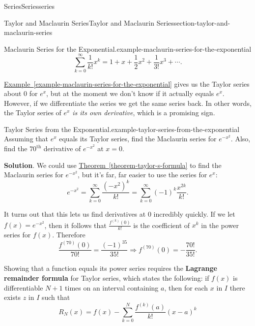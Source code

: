 \documentclass[oneside,10pt,]{book}
\newcommand{\terminology}[1]{\textbf{#1}}
\numberwithin{equation}{section}
\begin{document}
\begin{chapterptx}{Series}{}{Series}{}{}{series}
\begin{sectionptx}{Taylor and Maclaurin Series}{}{Taylor and Maclaurin Series}{}{}{section-taylor-and-maclaurin-series}
\begin{example}{Maclaurin Series for the Exponential.}{example-maclaurin-series-for-the-exponential}
\begin{equation*}
\sum_{k=0}^{\infty}\frac{1}{k!}x^{k} = 1 + x + \frac{1}{2}x^{2} + \frac{1}{3!}x^{3} + \cdots\text{.}
\end{equation*}
%
\end{example}
\hypertarget{p-966}{}%
\hyperref[example-maclaurin-series-for-the-exponential]{Example~\ref{example-maclaurin-series-for-the-exponential}} gives us the Taylor series about \(0\) for \(e^{x}\), but at the moment we don't know if it actually equals \(e^{x}\). However, if we differentiate the series we get the same series back. In other words, the Taylor series of \(e^{x}\) \emph{is its own derivative}, which is a promising sign.%
\begin{example}{Taylor Series from the Exponential.}{example-taylor-series-from-the-exponential}%
\hypertarget{p-967}{}%
Assuming that \(e^{x}\) equals its Taylor series, find the Maclaurin series for \(e^{-x^{2}}\). Also, find the \(70^{\text{th}}\) derivative of \(e^{-x^{2}}\) at \(x = 0\).%
\par\smallskip%
\noindent\textbf{Solution}.\hypertarget{solution-196}{}\quad%
\hypertarget{p-968}{}%
We could use \hyperref[theorem-taylor-s-formula]{Theorem~\ref{theorem-taylor-s-formula}} to find the Maclaurin series for \(e^{-x^{2}}\), but it's far, far easier to use the series for \(e^{x}\):%
\begin{equation*}
e^{-x^{2}} = \sum_{k=0}^{\infty}\frac{(-x^{2})^{k}}{k!} = \sum_{k=0}^{\infty}(-1)^{k}\frac{x^{2k}}{k!}\text{.}
\end{equation*}
%
\par
\hypertarget{p-969}{}%
It turns out that this lets us find derivatives at \(0\) incredibly quickly. If we let \(f(x) = e^{-x^{2}}\), then it follows that \(\frac{f^{(k)}(0)}{k!}\) is the coefficient of \(x^{k}\) in the power series for \(f(x)\). Therefore%
\begin{equation*}
\frac{f^{(70)}(0)}{70!} = \frac{(-1)^{35}}{35!} \Rightarrow f^{(70)}(0) = -\frac{70!}{35!}\text{.}
\end{equation*}
%
\end{example}
\hypertarget{p-970}{}%
Showing that a function equals its power series requires the \terminology{Lagrange remainder formula} for Taylor series, which states the following: if \(f(x)\) is differentiable \(N+1\) times on an interval containing \(a\), then for each \(x\) in \(I\) there exists \(z\) in \(I\) such that%
\begin{equation*}
R_{N}(x) = f(x) - \sum_{k=0}^{N}\frac{f^{(k)}(a)}{k!}(x - a)^{k}
\end{equation*}

\end{sectionptx}
\end{chapterptx}
\end{document}
